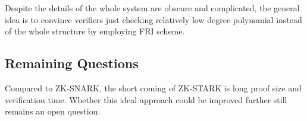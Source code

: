\documentclass[conference]{IEEEtran}
\begin{document}
Despite the details of the whole system are obscure and complicated, the general idea is to convince verifiers just checking relatively low degree polynomial instead of the whole structure by employing FRI scheme.

\subsection{Remaining Questions}
Compared to ZK-SNARK, the short coming of ZK-STARK is long proof size and verification time.
%
Whether this ideal approach could be improved further still remains an open question. 



\end{document}
